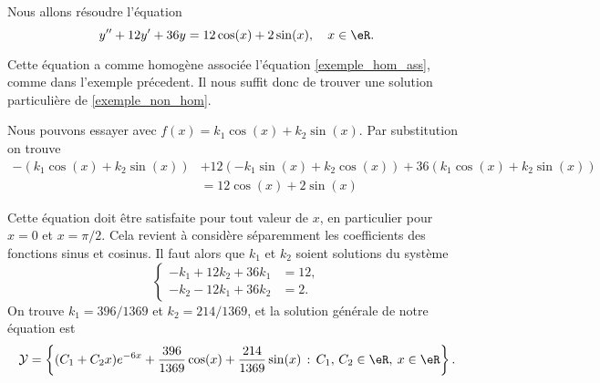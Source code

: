 \begin{example}
  Nous allons résoudre l'équation 
  \begin{equation}
    y'' + 12y' + 36 y = 12\cos(x) + 2\sin(x), \quad x\in\eR. 
  \end{equation}

Cette équation a comme homogène associée l'équation \eqref{exemple_hom_ass}, comme dans l'exemple précedent. Il nous suffit donc de trouver une solution particulière de \eqref{exemple_non_hom}.

Nous pouvons essayer avec $f(x)= k_1\cos(x) + k_2\sin(x)$. Par substitution on trouve
\begin{equation*}
  \begin{aligned}
    -\left(k_1\cos(x) + k_2\sin(x)\right) & +12 \left(-k_1\sin(x) + k_2\cos(x)\right) + 36\left(k_1\cos(x) + k_2\sin(x)\right)\\
    &= 12\cos(x) + 2\sin(x) 
  \end{aligned}
\end{equation*}

Cette équation doit \^etre satisfaite pour tout valeur de $x$, en particulier pour $x= 0$ et $x = \pi/2$. Cela revient à considère séparemment les coefficients des fonctions sinus et cosinus. Il faut alors que $k_1$ et $k_2$ soient solutions du système 
\begin{equation*}
  \begin{cases}
    -k_1 + 12 k_2 + 36 k_1& = 12, \\
    -k_2 - 12 k_1 + 36 k_2& = 2.
  \end{cases}
\end{equation*}
On trouve $k_1= 396/1369$ et $k_2 = 214/1369$, et la solution générale de notre équation est 
\begin{equation*}
   \mathcal{Y}  = \left\{(C_1  +C_2x) e^{-6 x} +\frac{396}{1369}\cos(x) + \frac{214}{1369}\sin(x) \,:\, C_1,\, C_2 \in \eR, \: x\in \eR\right\}.
\end{equation*}
\end{example}


